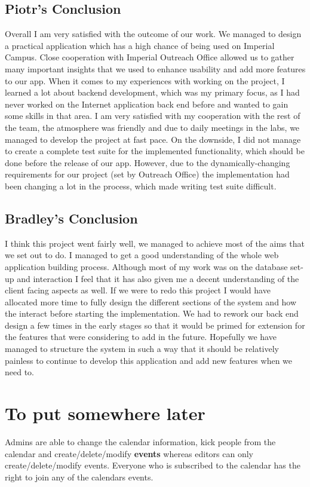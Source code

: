 \documentclass[10pt,a4paper]{article}
\begin{document}
 \subsection{Piotr's Conclusion}
 Overall I am very satisfied with the outcome of our work. We managed to design a practical application which has a high chance of being used on Imperial Campus. Close cooperation with Imperial Outreach Office allowed us to gather many important insights that we used to enhance usability and add more features to our app. When it comes to my experiences with working on the project, I learned a lot about backend development, which was my primary focus, as I had never worked on the Internet application back end before and wanted to gain some skills in that area. I am very satisfied with my cooperation with the rest of the team, the atmosphere was friendly and due to daily meetings in the labs, we managed to develop the project at fast pace. On the downside, I did not manage to create a complete test suite for the implemented functionality, which should be done before the release of our app. However, due to the dynamically-changing requirements for our project (set by Outreach Office) the implementation had been changing a lot in the process, which made writing test suite difficult. 
 
\subsection{Bradley's Conclusion}
I think this project went fairly well, we managed to achieve most of the aims that we set out to do. I managed to get a good understanding of the whole web application building process. Although most of my work was on the database set-up and interaction I feel that it has also given me a decent understanding of the client facing aspects as well. If we were to redo this project I would have allocated more time to fully design the different sections of the system and how the interact before starting the implementation. We had to rework our back end design a few times in the early stages so that it would be primed for extension for the features that were considering to add in the future. Hopefully we have managed to structure the system in such a way that it should be relatively painless to continue to develop this application and add new features when we need to.  


\newpage
\newpage
\section{To put somewhere later}
Admins are able to change the calendar information, kick people from the calendar and create/delete/modify \textbf{events} whereas editors can only create/delete/modify events. Everyone who is subscribed to the calendar has the right to join any of the calendars events.
\end{document}
